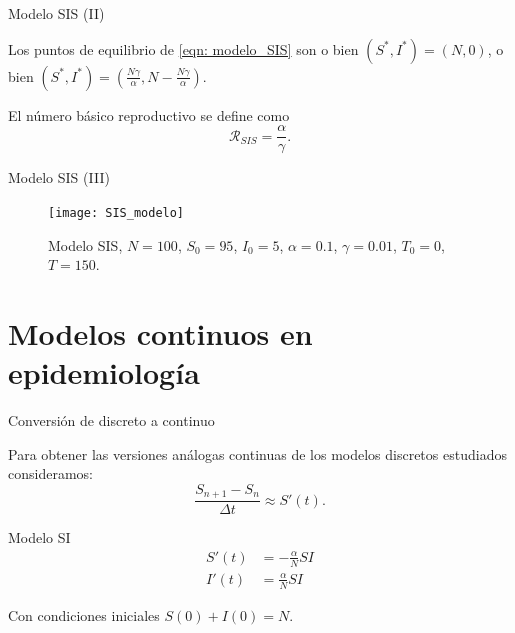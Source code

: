 \begin{frame}{Modelo SIS (II)}

        
        

    \begin{lema}
        Los puntos de equilibrio de \eqref{eqn: modelo_SIS} son o bien $(S^*,I^*)=(N,0)$, o bien $(S^*,I^*)=(\frac{N\gamma}{\alpha}, N-\frac{N\gamma}{\alpha})$.
    \end{lema}

    \pause

    \begin{definition}
        El número básico reproductivo se define como 
        $$\mathcal{R}_{SIS}=\frac{\alpha}{\gamma}.$$
    \end{definition}
\end{frame}


\begin{frame}{Modelo SIS (III)}


    \begin{figure}
        \begin{center}
        \caption{Modelo SIS, $N=100$, $S_0=95$, $I_0 = 5$, $\alpha = 0.1$, $\gamma=0.01$, $T_0 = 0$, $T = 150$.}
        \texttt{[image: SIS\_modelo]}
        \end{center}
    \end{figure}

\end{frame}




\section{Modelos continuos en epidemiología}



\begin{frame}{Conversión de discreto a continuo}

    Para obtener las versiones análogas continuas de los modelos discretos estudiados consideramos:    
    $$\frac{S_{n+1} - S_n}{\Delta t} \approx S'(t).$$
    
    \pause
    \begin{block}{Modelo SI}
        \begin{equation}
            \label{eqn:SI_continuo}
            \begin{aligned}
            S'(t) & = -\frac{\alpha}{N}SI \\
            I'(t) & = \frac{\alpha}{N}SI
            \end{aligned}
        \end{equation}
            
        Con condiciones iniciales $S(0)+I(0)=N$.
    \end{block}
\end{frame}


